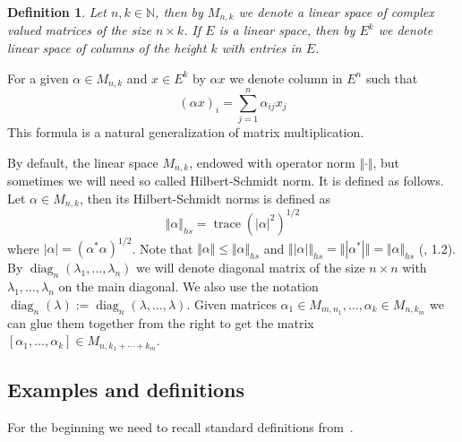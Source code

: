 \documentclass[12pt]{article}
\newtheorem{definition}[theorem]{Definition}
\begin{document}
\begin{definition}\label{DefMatrNot} Let $n,k\in\mathbb{N}$, then by $M_{n,k}$
we denote a linear space of complex valued matrices of the size $n\times k$. If
$E$ is a linear space, then by $E^k$ we denote linear space of columns of the
height $k$ with entries in $E$.
\end{definition}

For a given $\alpha\in M_{n,k}$ and $x\in E^k$ by $\alpha x$ we denote column in
$E^n$ such that
$$
{(\alpha x)}_i=\sum\limits_{j=1}^n \alpha_{ij} x_j
$$
This formula is a natural generalization of matrix multiplication.

By default, the linear space $M_{n,k}$, endowed with operator norm
$\Vert\cdot\Vert$, but sometimes we will need so called Hilbert-Schmidt norm. It
is defined as follows. Let $\alpha\in M_{n,k}$, then its Hilbert-Schmidt norms
is defined as
$$
\Vert\alpha\Vert_{hs}=\operatorname{trace}{(|\alpha|^2)}^{1/2}
$$
where $|\alpha|={(\alpha^*\alpha)}^{1/2}$. Note that
$\Vert\alpha\Vert\leq\Vert\alpha\Vert_{hs}$ and
$\Vert|\alpha|\Vert_{hs}=\Vert|\alpha^*|\Vert=\Vert\alpha\Vert_{hs}$
(\cite{EROpSp}, 1.2). By $\operatorname{diag}_n(\lambda_1,\ldots,\lambda_n)$  we
will denote diagonal matrix of the size $n\times n$ with
$\lambda_1,\ldots,\lambda_n$ on the main diagonal. We also use the notation
$\operatorname{diag}_n(\lambda):=\operatorname{diag}_n(\lambda,\ldots,\lambda)$.
Given matrices $\alpha_1\in M_{m,n_1},\ldots,\alpha_k\in M_{n,k_m}$ we can glue
them together from the right to get the matrix 
$[\alpha_1,\ldots,\alpha_k]\in M_{n,k_1+\cdots+k_m}$.





























\subsection{Examples and definitions} 
For the beginning we need to recall standard definitions 
from~\cite{LamOpFolgen}.
\end{document}
